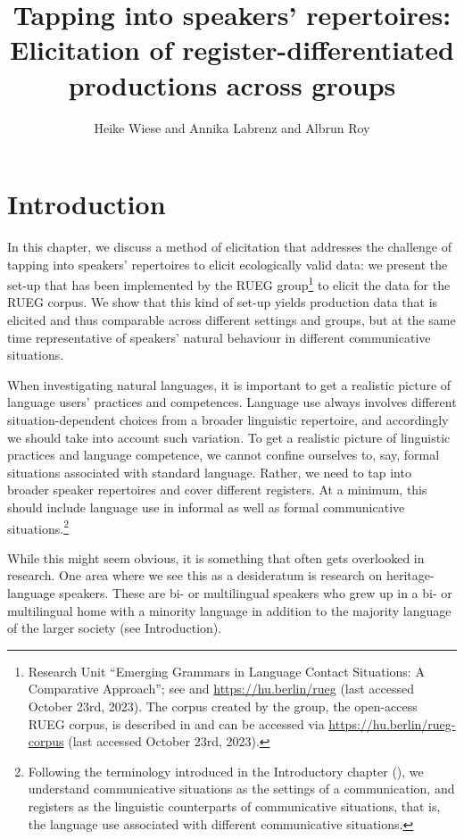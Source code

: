 \documentclass[output=paper,colorlinks,citecolor=brown]{langscibook}
\title[Tapping into speakers' repertoires]{Tapping into speakers' repertoires: Elicitation of register-differentiated productions across groups}
\author{Heike Wiese\orcid{0000-0002-6310-3045}\affiliation{Humboldt-Universität zu Berlin} and Annika Labrenz\orcid{0000-0002-6235-9321}\affiliation{Humboldt-Universität zu Berlin} and Albrun Roy\affiliation{Humboldt-Universität zu Berlin}}
\begin{document}
\maketitle

\section{Introduction}\label{ch1:sec:1} 

In this chapter, we discuss a method of elicitation that addresses the challenge of tapping into speakers’ repertoires to elicit ecologically valid data: we present the set-up that has been implemented by the RUEG group\footnote{\textsc{R}esearch \textsc{U}nit “\textsc{E}merging \textsc{G}rammars in Language Contact Situations: A Comparative Approach”; see  and \url{https://hu.berlin/rueg} (last accessed October 23rd, 2023). The corpus created by the group, the open-access RUEG corpus, is described in  and can be accessed via \url{https://hu.berlin/rueg-corpus} (last accessed October 23rd, 2023).}  to elicit the data for the RUEG corpus. We show that this kind of set-up yields production data that is elicited and thus comparable across different settings and groups, but at the same time representative of speakers’ natural behaviour in different communicative situations.

When investigating natural languages, it is important to get a realistic picture of language users’ practices and competences. Language use always involves different situation-dependent choices from a broader linguistic repertoire, and accordingly we should take into account such variation. To get a realistic picture of linguistic practices and language competence, we cannot confine ourselves to, say, formal situations associated with standard language. Rather, we need to tap into broader speaker repertoires and cover different registers. At a minimum, this should include language use in informal as well as formal communicative situations.\footnote{Following the terminology introduced in the Introductory chapter (), we understand communicative situations as the settings of a communication, and registers as the linguistic counterparts of communicative situations, that is, the language use associated with different communicative situations.} 

While this might seem obvious, it is something that often gets overlooked in research. One area where we see this as a desideratum is research on heritage-language speakers. These are bi- or multilingual speakers who grew up in a bi- or multilingual home with a minority language in addition to the majority language of the larger society (see Introduction).
\end{document}
